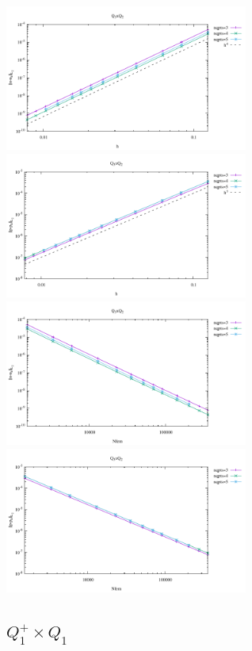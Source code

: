\begin{center}
\includegraphics[width=8cm]{python_codes/fieldstone_120/results/Q3Q2-velocity-h.pdf}
\includegraphics[width=8cm]{python_codes/fieldstone_120/results/Q3Q2-pressure-h.pdf}\\
\includegraphics[width=8cm]{python_codes/fieldstone_120/results/Q3Q2-velocity-Nfem.pdf}
\includegraphics[width=8cm]{python_codes/fieldstone_120/results/Q3Q2-pressure-Nfem.pdf}
\end{center}

\subsection*{$Q_1^+\times Q_1$}

